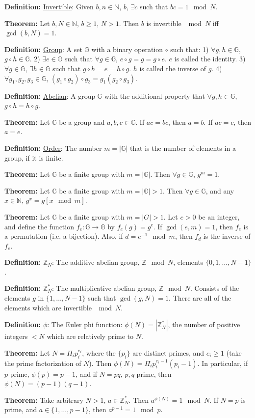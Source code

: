 \documentclass[10pt]{article}
\newcommand{\Z}{\mathbb{Z}}
\newcommand{\N}{\mathbb{N}}
\newcommand{\G}{\mathbb{G}}
\newcommand{\defn}[1]{{\bf Definition:} \underline{#1}}
\newcommand{\thm}[1]{{\bf Theorem:} \underline{#1}}
\begin{document}
\begin{multicols}{5}
\defn{Invertible}: Given $b,n\in\N$, $b$, $\exists c$ such that $bc=1\mod{N}$.

\thm{}Let $b,N\in\N$, $b\geq1$, $N>1$. Then $b$ is invertible $\mod{N}$ iff $\gcd(b,N)=1$.

\defn{Group}: A set $\G$ with a binary operation $\circ$ such that: 1) $\forall g,h\in\G$, $g\circ h\in\G$. 2) $\exists e\in\G$ such that $\forall g\in\G$, $e\circ g=g=g\circ e$. $e$ is called the identity. 3) $\forall g\in\G$, $\exists h\in\G$ such that $g\circ h=e=h\circ g$. $h$ is called the inverse of $g$. 4) $\forall g_1,g_2,g_3\in\G$, $(g_1\circ g_2)\circ g_3=g_1(g_2\circ g_3)$.

\defn{Abelian}: A group $\G$ with the additional property that $\forall g,h\in\G$, $g\circ h=h\circ g$.

\thm{}Let $\G$ be a group and $a,b,c\in\G$. If $ac=bc$, then $a=b$. If $ac=c$, then $a=e$.

\defn{Order}: The number $m=|\G|$ that is the number of elements in a group, if it is finite.

\thm{}Let $\G$ be a finite group with $m=|\G|$. Then $\forall g\in\G$, $g^m=1$.

\thm{}Let $\G$ be a finite group with $m=|\G|>1$. Then $\forall g\in\G$, and any $x\in\N$, $g^{x}=g{[x\mod{m}]}$.

\thm{}Let $\G$ be a finite group with $m=|G|>1$. Let $e>0$ be an integer, and define the function $f_e:\G\to\G$ by $f_e(g)=g^e$. If $\gcd(e,m)=1$, then $f_e$ is a permutation (i.e. a bijection). Also, if $d=e^{-1}\mod{m}$, then $f_d$ is the inverse of $f_e$.

\defn{$\Z_N$}: The additive abelian group, $\Z\mod{N}$, elements $\{0,1,\dots,N-1\}$. 

\defn{$\Z_N^*$}: The multiplicative abelian group, $\Z\mod{N}$. Consists of the elements $g$ in $\{1,\dots,N-1\}$ such that $\gcd(g,N)=1$. There are all of the elements which are invertible $\mod{N}$.

\defn{$\phi$}: The Euler phi function: $\phi(N)=|\Z_N^*|$, the number of positive integers $<N$ which are relatively prime to $N$.

\thm{}Let $N=\Pi_ip_i^{e_i}$, where the $\{p_i\}$ are distinct primes, and $e_i\geq 1$ (take the prime factorization of $N$). Then $\phi(N)=\Pi_ip_i^{e_i-1}(p_i-1)$. In particular, if $p$ prime, $\phi(p)=p-1$, and if $N=pq$, $p,q$ prime, then $\phi(N)=(p-1)(q-1)$.

\thm{}Take arbitrary $N>1$, $a\in\Z_N^*$. Then $a^{\phi(N)}=1\mod{N}$. If $N=p$ is prime, and $a\in\{1,\dots,p-1\}$, then $a^{p-1}=1\mod{p}$.


\end{multicols}
\end{document}
